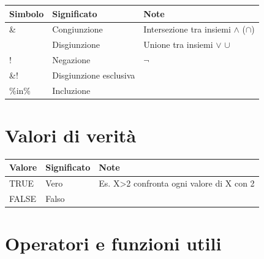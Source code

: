 \documentclass[
  a4paper,
  DIV=11,
  numbers=noendperiod]{scrreprt}
\begin{document}
\begin{longtable}[]{@{}
  >{\raggedright\arraybackslash}p{}
  >{\raggedright\arraybackslash}p{}
  >{\raggedright\arraybackslash}p{}@{}}
\toprule\noalign{}
\begin{minipage}[b]{\linewidth}\raggedright
Simbolo
\end{minipage} & \begin{minipage}[b]{\linewidth}\raggedright
Significato
\end{minipage} & \begin{minipage}[b]{\linewidth}\raggedright
Note
\end{minipage} \\
\midrule\noalign{}
\endhead
\bottomrule\noalign{}
\endlastfoot
\& & Congiunzione & Intersezione tra insiemi \(\land\) (\(\cap\)) \\
\textbar{} & Disgiunzione & Unione tra insiemi \(\lor\) \(\cup\) \\
! & Negazione & \(\lnot\) \\
\&! & Disgiunzione esclusiva & \\
\%in\% & Incluzione & \\
\end{longtable}

\section{Valori di verità}\label{valori-di-verituxe0}

\begin{longtable}[]{@{}lll@{}}
\toprule\noalign{}
Valore & Significato & Note \\
\midrule\noalign{}
\endhead
\bottomrule\noalign{}
\endlastfoot
TRUE & Vero & Es. X\textgreater2 confronta ogni valore di X con 2 \\
FALSE & Falso & \\
\end{longtable}

\section{Operatori e funzioni utili}\label{operatori-e-funzioni-utili}
\end{document}
